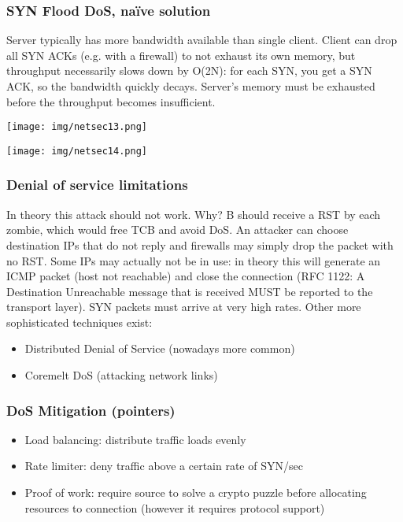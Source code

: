\documentclass[a4paper, 10pt, titlepage]{article}
\begin{document}
\subsubsection*{SYN Flood DoS, naïve solution}
Server typically has more bandwidth available than single client. Client can drop all SYN ACKs (e.g. with a firewall) to not exhaust its own memory, but throughput necessarily slows down by O(2N): for each SYN, you get a SYN ACK, so the bandwidth quickly decays. Server’s memory must be exhausted before the throughput becomes insufficient.
\begin{center}
	\texttt{[image: img/netsec13.png]}
\end{center}
\begin{center}
	\texttt{[image: img/netsec14.png]}
\end{center}

\subsubsection*{Denial of service limitations}
In theory this attack should not work. Why? B should receive a RST by each zombie, which would free TCB and avoid DoS. An attacker can choose destination IPs that do not reply and firewalls may simply drop the packet with no RST. Some IPs may actually not be in use: in theory this will generate an ICMP packet (host not reachable) and close the connection (RFC 1122: A Destination Unreachable message that is received MUST be reported to the transport layer).
SYN packets must arrive at very high rates. Other more sophisticated techniques exist:
\begin{itemize}
\item Distributed Denial of Service (nowadays more common)
\item Coremelt DoS (attacking network links)
\end{itemize}

\subsubsection*{DoS Mitigation (pointers)}
\begin{itemize}
\item Load balancing: distribute traffic loads evenly
\item Rate limiter: deny traffic above a certain rate of SYN/sec
\item Proof of work: require source to solve a crypto puzzle before allocating resources to connection (however it requires protocol support)
\end{itemize}
\end{document}
